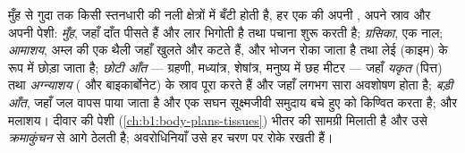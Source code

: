 \begin{proposition}[किसी स्तनधारी की पाचन नली]\label{prop:b1:digestion-absorption:tract}
मुँह से गुदा तक किसी स्तनधारी की नली क्षेत्रों में बँटी होती है, हर एक की
अपनी , अपने स्राव और अपनी पेशी: \emph{मुँह}, जहाँ दाँत पीसते हैं और
लार भिगोती है तथा  पचाना शुरू करती है; \emph{ग्रसिका}, एक नाल;
\emph{आमाशय}, अम्ल की एक थैली जहाँ  खुलते और कटते हैं, और भोजन
रोका जाता है तथा लेई (काइम) के रूप में छोड़ा जाता है; \emph{छोटी आँत} ---
ग्रहणी, मध्यांत्र, शेषांत्र, मनुष्य में छह मीटर --- जहाँ \emph{यकृत}
(पित्त) तथा \emph{अग्न्याशय} ( और बाइकार्बोनेट) के स्राव  पूरा
करते हैं और जहाँ लगभग सारा अवशोषण होता है; \emph{बड़ी आँत}, जहाँ जल वापस
पाया जाता है और एक सघन सूक्ष्मजीवी समुदाय बचे हुए को किण्वित करता है; और
मलाशय। दीवार की पेशी (\cref{ch:b1:body-plans-tissues}) भीतर की सामग्री
मिलाती है और उसे \emph{क्रमाकुंचन} से आगे ठेलती है; अवरोधिनियाँ उसे हर
चरण पर रोके रखती हैं।
\end{proposition}

